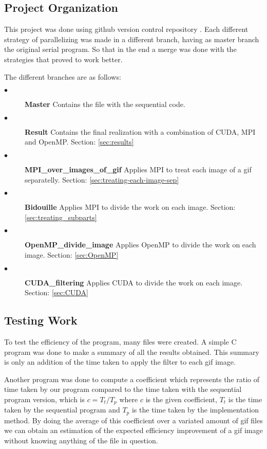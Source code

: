 \documentclass[conference,compsoc]{IEEEtran}
\begin{document}
\subsection{Project Organization} \label{sec:project-organization}
This project was done using github version control repository \cite{GITREPOSITORY}. Each different strategy of parallelizing was made in a different branch, having as master branch the original serial program. So that in the end a merge was done with the strategies that proved to work better.

The different branches are as follows:
\begin{description}
	\item[$\bullet$] \textbf{Master} Contains the file with the sequential code.
	\item[$\bullet$] \textbf{Result} Contains the final realization with a combination of CUDA, MPI and OpenMP. Section: \ref{sec:results}
	\item[$\bullet$] \textbf{MPI\_over\_images\_of\_gif} Applies MPI to treat each image of a gif separatelly. Section: \ref{sec:treating-each-image-sep}
	\item[$\bullet$] \textbf{Bidouille} Applies MPI to divide the work on each image. Section: \ref{sec:treating_subparts}
	\item[$\bullet$] \textbf{OpenMP\_divide\_image} Applies OpenMP to divide the work on each image. Section: \ref{sec:OpenMP}
	\item[$\bullet$] \textbf{CUDA\_filtering} Applies CUDA to divide the work on each image. Section: \ref{sec:CUDA}
\end{description}

\subsection{Testing Work}

To test the efficiency of the program, many files were created. A simple C program was done to make a summary of all the results obtained. This summary is only an addition of the time taken to apply the filter to each gif image.

Another program was done to compute a coefficient which represents the ratio of time taken by our program compared to the time taken with the sequential program version, which is $ c = T_{t} / T_{p} $ where $c$ is the given coefficient, $T_{t}$ is the time taken by the sequential program and $T_{p}$ is the time taken by the implementation method. By doing the average of this coefficient over a variated amount of gif files we can obtain an estimation of the expected efficiency improvement of a gif image without knowing anything of the file in question. 
\end{document}
